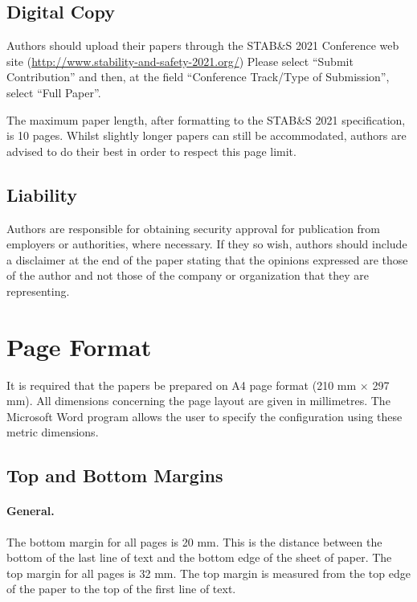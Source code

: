 \documentclass{stabs2021}
\begin{document}
\subsection{Digital Copy}

Authors should upload their papers through the STAB\&S 2021 Conference
web site (\url{http://www.stability-and-safety-2021.org/}) Please
select ``Submit Contribution'' and then, at the field ``Conference
Track/Type of Submission'', select ``Full Paper''.

The maximum paper length, after formatting to the STAB\&S 2021
specification, is 10 pages. Whilst slightly longer papers can still be
accommodated, authors are advised to do their best in order to respect
this page limit.

\subsection{Liability}

Authors are responsible for obtaining security approval for
publication from employers or authorities, where necessary. If they so
wish, authors should include a disclaimer at the end of the paper
stating that the opinions expressed are those of the author and not
those of the company or organization that they are representing.

\section{Page Format}

It is required that the papers be prepared on A4 page format (210 mm
\(\times\) 297 mm). All dimensions concerning the page layout are
given in millimetres. The Microsoft Word program allows the user to
specify the configuration using these metric dimensions.

\subsection{Top and Bottom Margins}

\paragraph{General.}

The bottom margin for all pages is 20 mm. This is the distance between
the bottom of the last line of text and the bottom edge of the sheet
of paper. The top margin for all pages is 32 mm. The top margin is
measured from the top edge of the paper to the top of the first line
of text.
\end{document}
